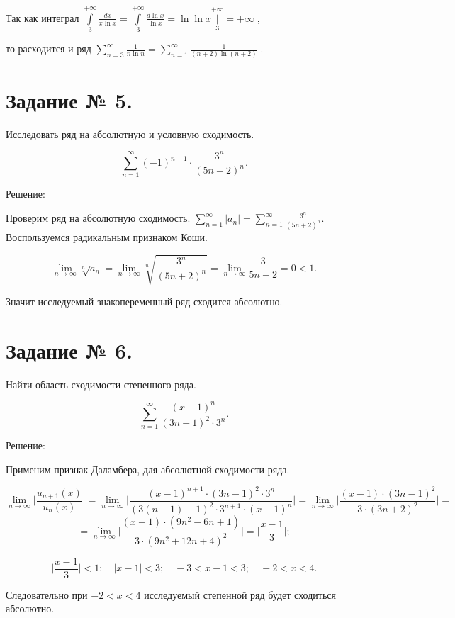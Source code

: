 \documentclass{article}
\begin{document}
Так как интеграл $\int\limits_{3}^{+\infty}\frac{dx}{x\ln{x}}=\int\limits_{3}^{+\infty}\frac{d\ln x}{\ln{x}}=\ln{\ln{x}}\bigg|\limits_{3}^{+\infty}=+\infty\;$,


то расходится и ряд  $\sum\limits_{n=3}^{\infty}\frac{1}{n\ln{n}}=\sum\limits_{n=1}^{\infty}\frac{1}{(n+2)\ln{(n+2)}}\;$.

\section*{Задание № 5.}

Исследовать ряд на абсолютную и условную сходимость.

$$\sum\limits_{n=1}^{\infty}(-1)^{n-1}\cdot\frac{3^n}{(5n+2)^n}.$$

\begin{center}Решение:\end{center}

Проверим ряд на абсолютную сходимость. $\sum\limits_{n=1}^{\infty}|a_n|=\sum\limits_{n=1}^{\infty}\frac{3^n}{(5n+2)^n}.$
Воспользуемся радикальным признаком Коши.

$$\lim_{n\to\infty}\sqrt[n]{a_n}=\lim_{n\to\infty}\sqrt[n]{\frac{3^n}{(5n+2)^n}}=\lim_{n\to\infty}{\frac{3}{5n+2}}=0<1.$$

Значит исследуемый знакопеременный ряд сходится абсолютно.

\section*{Задание № 6.}

Найти область сходимости степенного ряда.

$$\sum\limits_{n=1}^{\infty}\frac{(x-1)^n}{(3n-1)^2\cdot3^n}.$$

\begin{center}Решение:\end{center}

Применим признак Даламбера, для абсолютной сходимости ряда.

$$\lim_{n\to\infty}\bigg|\frac{u_{n+1}(x)}{u_n(x)}\bigg|=\lim_{n\to\infty}\bigg|\frac{(x-1)^{n+1}\cdot(3n-1)^2\cdot3^n}{(3(n+1)-1)^2\cdot3^{n+1}\cdot(x-1)^n}\bigg|=\lim_{n\to\infty}\bigg|\frac{(x-1)\cdot(3n-1)^2}{3\cdot(3n+2)^2}\bigg|=$$
$$=\lim_{n\to\infty}\bigg|\frac{(x-1)\cdot(9n^2-6n+1)}{3\cdot(9n^2+12n+4)^2}\bigg|=\bigg|\frac{x-1}{3}\bigg|;$$

$$\bigg|\frac{x-1}{3}\bigg|<1;\quad|x-1|<3;\quad-3<x-1<3;\quad-2<x<4.$$

Следовательно при $-2<x<4$ исследуемый степенной ряд будет сходиться абсолютно.
\end{document}

